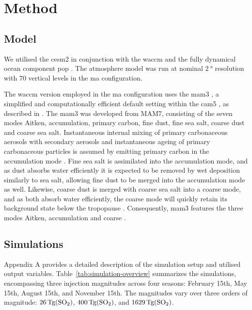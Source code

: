 \documentclass{ametsocV6.1}
\begin{document}
\section{Method}\label{sec:method}

\subsection{Model}

We utilised the \gls{cesm2} \citep{danabasoglu2020} in conjunction with the \gls{waccm}
\citep{gettleman2019} and the fully dynamical ocean component \gls{pop}
\citep{smith2010, danabasoglu2020}. The atmosphere model was run at nominal
\(\SI{2}{\degree}\) resolution with \(70\) vertical levels in the \gls{ma}
configuration.

The \gls{waccm} version employed in the \gls{ma} configuration uses the \gls{mam3}
\citep{gettleman2019}, a simplified and computationally efficient default setting within
the \gls{cam5} \citep{liu2016}, as described in \citet{liu2012}. The \gls{mam3} was
developed from MAM7, consisting of the seven modes Aitken, accumulation, primary carbon,
fine dust, fine sea salt, coarse dust and coarse sea salt. Instantaneous internal mixing
of primary carbonaceous aerosols with secondary aerosols and instantaneous ageing of
primary carbonaceous particles is assumed by emitting primary carbon in the accumulation
mode \citep{liu2016}. Fine sea salt is assimilated into the accumulation mode, and as
dust absorbs water efficiently it is expected to be removed by wet deposition similarly
to sea salt, allowing fine dust to be merged into the accumulation mode as well.
Likewise, coarse dust is merged with coarse sea salt into a coarse mode, and as both
absorb water efficiently, the coarse mode will quickly retain its background state below
the tropopause \citep{liu2012}. Consequently, \gls{mam3} features the three modes
Aitken, accumulation and coarse \citep{liu2016}.

\subsection{Simulations}

Appendix A provides a detailed description of the simulation setup and utilised output
variables. Table~\ref{tab:simulation-overview} summarizes the simulations, encompassing
three  injection magnitudes across four seasons: February 15th, May 15th, August
15th, and November 15th. The magnitudes vary over three orders of magnitude:
\(\SI{26}{\tera\gram(\ce{SO2})}\), \(\SI{400}{\tera\gram(\ce{SO2})}\), and
\(\SI{1629}{\tera\gram(\ce{SO2})}\).
\end{document}
